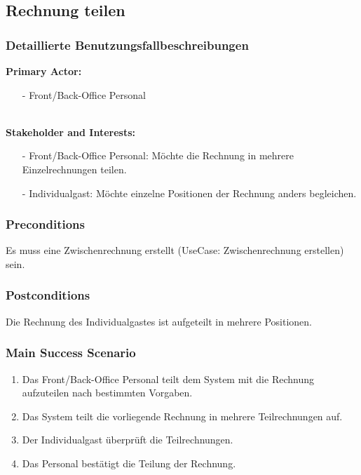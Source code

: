\documentclass[./detailed_overview_usecases.tex]{subfiles}
\begin{document}
    \subsection{Rechnung teilen}
    \subsubsection{Detaillierte Benutzungsfallbeschreibungen}
    \textbf{Primary Actor: }
    \begin{itemize}
        \item [-] Front/Back-Office Personal
    \end{itemize}
    \\
    \textbf{Stakeholder and Interests:}
    \begin{itemize}
        \item[-] Front/Back-Office Personal: Möchte die Rechnung in mehrere Einzelrechnungen teilen.
        \item[-] Individualgast: Möchte einzelne Positionen der Rechnung anders begleichen.
    \end{itemize}

    \subsubsection*{Preconditions}
    Es muss eine Zwischenrechnung erstellt (UseCase: Zwischenrechnung erstellen) sein.

    \subsubsection*{Postconditions}
    Die Rechnung des Individualgastes ist aufgeteilt in mehrere Positionen.

    \subsubsection*{Main Success Scenario}
    \begin{enumerate}
        \item Das Front/Back-Office Personal teilt dem System mit die Rechnung aufzuteilen nach bestimmten Vorgaben.
        \item Das System teilt die vorliegende Rechnung in mehrere Teilrechnungen auf.
        \item Der Individualgast überprüft die Teilrechnungen.
        \item Das Personal bestätigt die Teilung der Rechnung.
    \end{enumerate}
\end{document}
